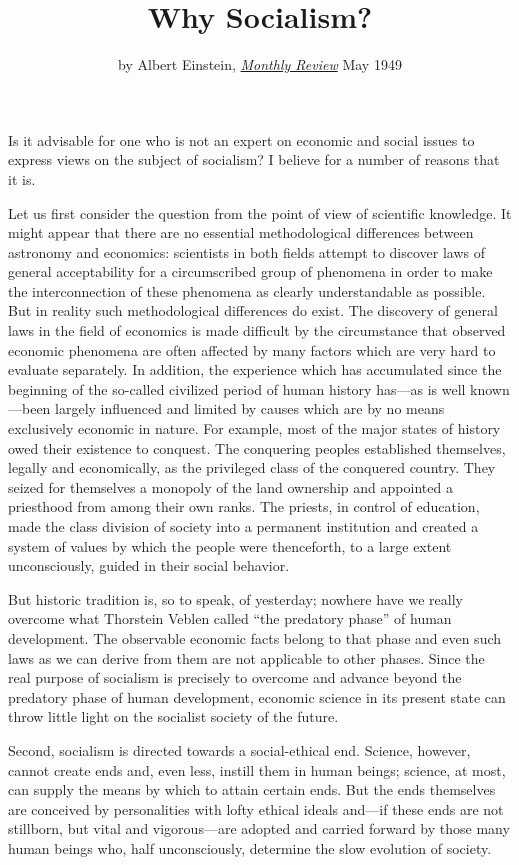 \documentclass[12pt]{article}
\title{\vspace{-2.5cm}Why Socialism?\vspace{-8mm}}
\author{by Albert Einstein, \href{https://monthlyreview.org/2009/05/01/why-socialism/}{\textit{Monthly Review}} May 1949}
\date{\vspace{-2em}}
\begin{document}
\maketitle

Is it advisable for one who is not an expert on economic and social issues to express views on the subject of socialism? I believe for a number of reasons that it is.

Let us first consider the question from the point of view of scientific knowledge. It might appear that there are no essential methodological differences between astronomy and economics: scientists in both fields attempt to discover laws of general acceptability for a circumscribed group of phenomena in order to make the interconnection of these phenomena as clearly understandable as possible. But in reality such methodological differences do exist. The discovery of general laws in the field of economics is made difficult by the circumstance that observed economic phenomena are often affected by many factors which are very hard to evaluate separately. In addition, the experience which has accumulated since the beginning of the so-called civilized period of human history has—as is well known—been largely influenced and limited by causes which are by no means exclusively economic in nature. For example, most of the major states of history owed their existence to conquest. The conquering peoples established themselves, legally and economically, as the privileged class of the conquered country. They seized for themselves a monopoly of the land ownership and appointed a priesthood from among their own ranks. The priests, in control of education, made the class division of society into a permanent institution and created a system of values by which the people were thenceforth, to a large extent unconsciously, guided in their social behavior.

But historic tradition is, so to speak, of yesterday; nowhere have we really overcome what Thorstein Veblen called “the predatory phase” of human development. The observable economic facts belong to that phase and even such laws as we can derive from them are not applicable to other phases. Since the real purpose of socialism is precisely to overcome and advance beyond the predatory phase of human development, economic science in its present state can throw little light on the socialist society of the future.

Second, socialism is directed towards a social-ethical end. Science, however, cannot create ends and, even less, instill them in human beings; science, at most, can supply the means by which to attain certain ends. But the ends themselves are conceived by personalities with lofty ethical ideals and—if these ends are not stillborn, but vital and vigorous—are adopted and carried forward by those many human beings who, half unconsciously, determine the slow evolution of society.
\end{document}
